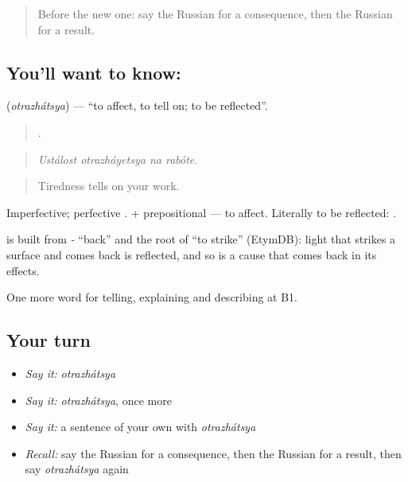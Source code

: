 \label{lesson:RU-C350-otrazhatsya}



\begin{quote}
Before the new one: say the Russian for a consequence, then the Russian for a result.
\end{quote}

\subsection*{You'll want to know: }
\textbf{} (\emph{otrazhátsya}) — \textquotedblleft{}to affect, to tell on; to be reflected\textquotedblright{}.

\begin{quote}
   .
\end{quote}

\begin{quote}
\emph{Ustálost otrazháyetsya na rabóte.}
\end{quote}

\begin{quote}
Tiredness tells on your work.
\end{quote}

Imperfective; perfective \emph{}. \emph{ } + prepositional — to affect. Literally to be reflected: \emph{   }.

\begin{cousinweb}
\textbf{} is built from \emph{-} \textquotedblleft{}back\textquotedblright{} and the root of \emph{} \textquotedblleft{}to strike\textquotedblright{} (EtymDB): light that strikes a surface and comes back is reflected, and so is a cause that comes back in its effects.
\end{cousinweb}

\begin{grammarlens}[title={What you've built}]
One more word for telling, explaining and describing at B1.
\end{grammarlens}

\subsection*{Your turn}
\begin{itemize}
\raggedright
  \item \emph{Say it:} \emph{otrazhátsya}
  \item \emph{Say it:} \emph{otrazhátsya}, once more
  \item \emph{Say it:} a sentence of your own with \emph{otrazhátsya}
  \item \emph{Recall:} say the Russian for a consequence, then the Russian for a result, then say \emph{otrazhátsya} again
\end{itemize}

